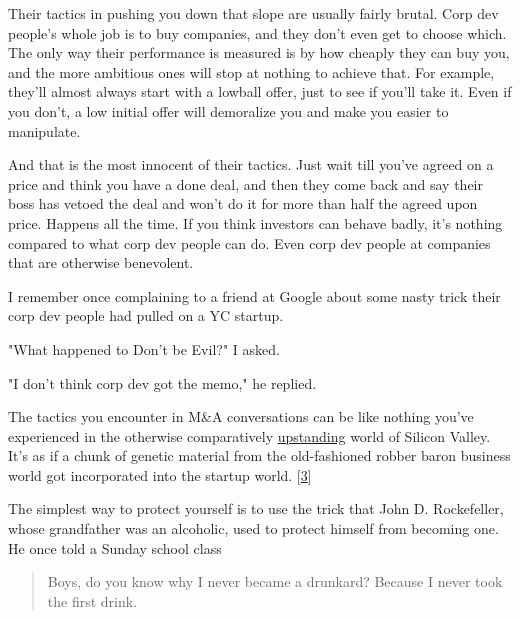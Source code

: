 Their
                  tactics in pushing you down that slope are usually fairly
                  brutal. Corp dev people's whole job is to buy companies, and
                  they don't even get to choose which. The only way their
                  performance is measured is by how cheaply they can buy you,
                  and the more ambitious ones will stop at nothing to achieve
                  that. For example, they'll almost always start with a lowball
                  offer, just to see if you'll take it. Even if you don't, a low
                  initial offer will demoralize you and make you easier to
                  manipulate.

And that is the most innocent of their
                  tactics. Just wait till you've agreed on a price and think you
                  have a done deal, and then they come back and say their boss
                  has vetoed the deal and won't do it for more than half the
                  agreed upon price. Happens all the time. If you think
                  investors can behave badly, it's nothing compared to what corp
                  dev people can do. Even corp dev people at companies that are
                  otherwise benevolent.

I remember once complaining
                  to a friend at Google about some nasty trick their corp dev
                  people had pulled on a YC startup.

"What happened
                  to Don't be Evil?" I asked.

"I don't think corp dev
                  got the memo," he replied.

The tactics you
                  encounter in M\&A conversations can be like nothing you've
                  experienced in the otherwise comparatively
                  \href{http://www.paulgraham.com/mean.html}{upstanding} world of Silicon Valley.
                  It's as if a chunk of genetic material from the old-fashioned
                  robber baron business world got incorporated into the startup
                  world.
                  [\href{\#f3n}{3}]

The simplest way to protect yourself is to use
                  the trick that John D. Rockefeller, whose grandfather was an
                  alcoholic, used to protect himself from becoming one. He once
                  told a Sunday school class
                  \begin{quote}

                    Boys, do you know why I never became a drunkard? Because I
                    never took the first drink.
                  
\end{quote}

